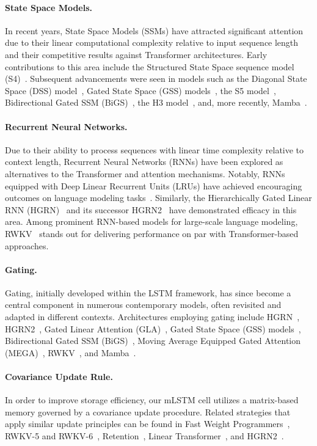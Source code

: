 \paragraph{State Space Models.} In recent years, State Space Models (SSMs) have attracted significant attention due to their linear computational complexity relative to input sequence length and their competitive results against Transformer architectures. Early contributions to this area include the Structured State Space sequence model (S4)~\citep{Gu:21}. Subsequent advancements were seen in models such as the Diagonal State Space (DSS) model~\citep{Gupta:22}, Gated State Space (GSS) models~\citep{Mehta:22}, the S5 model~\citep{Smith:22}, Bidirectional Gated SSM (BiGS)~\citep{Wang:22}, the H3 model~\citep{Fu:23}, and, more recently, Mamba~\citep{Gu:24arxiv}.

\paragraph{Recurrent Neural Networks.} Due to their ability to process sequences with linear time complexity relative to context length, Recurrent Neural Networks (RNNs) have been explored as alternatives to the Transformer and attention mechanisms. Notably, RNNs equipped with Deep Linear Recurrent Units (LRUs) have achieved encouraging outcomes on language modeling tasks~\citep{Orvieto:23, De:24arxiv}. Similarly, the Hierarchically Gated Linear RNN (HGRN)~\citep{Qin:23} and its successor HGRN2~\citep{Qin:24arxiv} have demonstrated efficacy in this area. Among prominent RNN-based models for large-scale language modeling, RWKV~\citep{Peng:23arxivshort,Peng:24arxivshort} stands out for delivering performance on par with Transformer-based approaches.

\paragraph{Gating.}
Gating, initially developed within the LSTM framework, has since become a central component in numerous contemporary models, often revisited and adapted in different contexts. Architectures employing gating include HGRN~\citep{Qin:23}, HGRN2~\citep{Qin:24arxiv}, Gated Linear Attention (GLA)~\citep{Yang:23arxiv}, Gated State Space (GSS) models~\citep{Mehta:22}, Bidirectional Gated SSM (BiGS)~\citep{Wang:22}, Moving Average Equipped Gated Attention (MEGA)~\citep{Ma:22}, RWKV~\citep{Peng:23arxivshort}, and Mamba~\citep{Gu:24arxiv}.

\paragraph{Covariance Update Rule.} 
In order to improve storage efficiency, our mLSTM cell utilizes a matrix-based memory governed by a covariance update procedure. Related strategies that apply similar update principles can be found in Fast Weight Programmers~\citep{Schmidhuber:92ncfastweights,Schlag:21}, RWKV-5 and RWKV-6~\citep{Peng:24arxivshort}, Retention~\citep{Sun:23arxiv}, Linear Transformer~\citep{Katharopoulos:20}, and HGRN2~\citep{Qin:24arxiv}.

